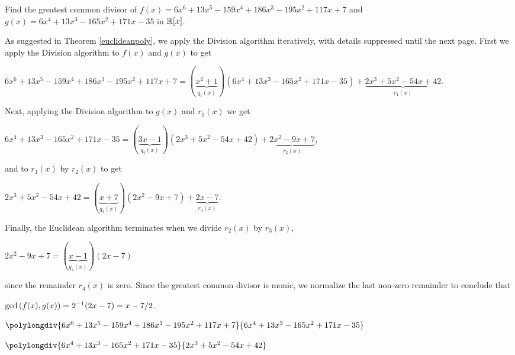 \documentclass[11pt,fleqn,dvipsnames,usenames]{article}
\newcommand{\p}{\noindent}
\begin{document}
%
\begin{example}
Find the greatest common divisor of $f(x) = 6x^6 + 13x^5 - 159x^4 + 186x^3 - 195x^2 + 117x + 7$ and $g(x) = 6x^4 + 13x^3 - 165x^2 + 171x - 35$ in $\mathbb{R}[x]$.
\end{example}
%
\begin{solution}
As suggested in Theorem \ref{euclideanpoly}, we apply the Division algorithm iteratively, with details suppressed until the next page.  First we apply the Division algorithm to $f(x)$ and $g(x)$ to get
\vsp

\begin{adjustwidth}{-50pt}{-50pt}
\begin{center}
$6x^6 + 13x^5 - 159x^4 + 186x^3 - 195x^2 + 117x + 7 = (\underbrace{x^2 + 1}_{q_{1}(x)})(6x^4 + 13x^3 - 165x^2 + 171x - 35) + \underbrace{2x^3 + 5x^2-54x + 42}_{r_{1}(x)}$.
\end{center}
\end{adjustwidth}
Next, applying the Division algorithm to $g(x)$ and $r_{1}(x)$ we get
\vsp

\begin{center}
$6x^4 + 13x^3 - 165x^2 + 171x - 35 = (\underbrace{3x-1}_{q_{2}(x)})(2x^3 + 5x^2 - 54x + 42) + \underbrace{2x^2 - 9x + 7}_{r_{2}(x)}$,
\end{center}
and to $r_{1}(x)$ by $r_{2}(x)$ to get
\vsp

\begin{center}
$2x^3 + 5x^2-54x + 42 = (\underbrace{x+7}_{q_{3}(x)})(2x^2 - 9x + 7) + \underbrace{2x-7}_{r_{3}(x)}$.
\end{center}
\vsp

\p Finally, the Euclidean algorithm terminates when we divide $r_{2}(x)$ by $r_{3}(x)$,
\begin{center}
\vsp

$2x^2 - 9x + 7 = (\underbrace{x-1}_{q_{4}(x)})(2x-7)$
\end{center}
since the remainder $r_{4}(x)$ is zero.  Since the greatest common divisor is monic, we normalize the last non-zero remainder to conclude that
\begin{center}
$\text{gcd}\left(f(x),g(x)\right) = 2^{-1}(2x - 7) = x - 7/2$.
\end{center}
\end{solution}
\newpage

$\polylongdiv{6x^6 + 13x^5 - 159x^4 + 186x^3 - 195x^2 + 117x + 7}{6x^4 + 13x^3 - 165x^2 + 171x - 35}$
\vspace{1cm}

$\polylongdiv{6x^4 + 13x^3 - 165x^2 + 171x - 35}{2x^3 + 5x^2 - 54x + 42}$
\vspace{1cm}
\end{document}

